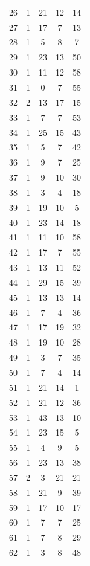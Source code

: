 \documentclass[12pt,a4paper]{report}
\begin{document}
\begin{appendices}
\begin{longtable}{lcccc}
26  &   1 &  21 &  12 &  14 \\
27  &   1 &  17 &   7 &  13 \\
28  &   1 &   5 &   8 &   7 \\
29  &   1 &  23 &  13 &  50 \\
30  &   1 &  11 &  12 &  58 \\
31  &   1 &   0 &   7 &  55 \\
32  &   2 &  13 &  17 &  15 \\
33  &   1 &   7 &   7 &  53 \\
34  &   1 &  25 &  15 &  43 \\
35  &   1 &   5 &   7 &  42 \\
36  &   1 &   9 &   7 &  25 \\
37  &   1 &   9 &  10 &  30 \\
38  &   1 &   3 &   4 &  18 \\
39  &   1 &  19 &  10 &   5 \\
40  &   1 &  23 &  14 &  18 \\
41  &   1 &  11 &  10 &  58 \\
42  &   1 &  17 &   7 &  55 \\
43  &   1 &  13 &  11 &  52 \\
44  &   1 &  29 &  15 &  39 \\
45  &   1 &  13 &  13 &  14 \\
46  &   1 &   7 &   4 &  36 \\
47  &   1 &  17 &  19 &  32 \\
48  &   1 &  19 &  10 &  28 \\
49  &   1 &   3 &   7 &  35 \\
50  &   1 &   7 &   4 &  14 \\
51  &   1 &  21 &  14 &   1 \\
52  &   1 &  21 &  12 &  36 \\
53  &   1 &  43 &  13 &  10 \\
54  &   1 &  23 &  15 &   5 \\
55  &   1 &   4 &   9 &   5 \\
56  &   1 &  23 &  13 &  38 \\
57  &   2 &   3 &  21 &  21 \\
58  &   1 &  21 &   9 &  39 \\
59  &   1 &  17 &  10 &  17 \\
60  &   1 &   7 &   7 &  25 \\
61  &   1 &   7 &   8 &  29 \\
62  &   1 &   3 &   8 &  48 \\

\end{longtable}
\end{appendices}
\end{document}

